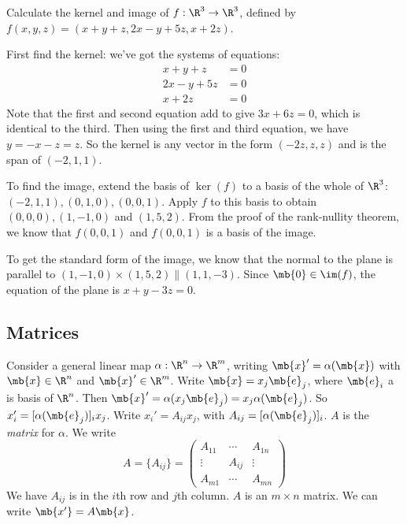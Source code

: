 \documentclass[a4paper]{article}
\begin{document}
\begin{eg}
  Calculate the kernel and image of $f:\R^3\to \R^3$, defined by $f(x, y, z) = (x + y + z, 2x - y+ 5z, x + 2z)$.

  First find the kernel: we've got the systems of equations:
  \begin{align*}
    x + y + z &= 0\\
    2x - y + 5z &= 0\\
    x + 2z  &= 0
  \end{align*}
  Note that the first and second equation add to give $3x + 6z = 0$, which is identical to the third. Then using the first and third equation, we have $y = -x - z = z$. So the kernel is any vector in the form $(-2z, z, z)$ and is the span of $(-2, 1, 1)$.

  To find the image, extend the basis of $\ker(f)$ to a basis of the whole of $\R^3$: $(-2, 1, 1), (0, 1, 0), (0, 0, 1)$. Apply $f$ to this basis to obtain $(0, 0, 0), (1, -1, 0)$ and $(1, 5, 2)$. From the proof of the rank-nullity theorem, we know that $f(0, 0, 1)$ and $f(0, 0, 1)$ is a basis of the image.

  To get the standard form of the image, we know that the normal to the plane is parallel to $(1, -1, 0)\times (1, 5, 2) \parallel (1, 1, -3)$. Since $\mb{0}\in \im (f)$, the equation of the plane is $x + y - 3z = 0$.
\end{eg}

\subsection{Matrices}
\begin{defi}[Matrix]
  Consider a general linear map $\alpha: \R^n\to \R^m$, writing $\mb{x}' = \alpha(\mb{x})$ with $\mb{x}\in \R^n$ and $\mb{x}'\in \R^m$. Write $\mb{x} = x_j\mb{e}_j$, where $\mb{e}_i$ a is basis of $\R^n$. Then $\mb{x}' = \alpha (x_j\mb{e}_j) = x_j\alpha(\mb{e}_j)$. So $x_i' = [\alpha(\mb{e}_j)]_ix_j$. Write $x_i' = A_{ij}x_j$, with $A_{ij} = [\alpha(\mb{e}_j)]_i$. $A$ is the \emph{matrix} for $\alpha$. We write
\[
A = \{A_{ij}\} =
\begin{pmatrix}
  A_{11} & \cdots & A_{1n}\\
  \vdots & A_{ij} & \vdots\\
  A_{m1} & \cdots & A_{mn}
\end{pmatrix}
\]
We have $A_{ij}$ is in the $i$th row and $j$th column. $A$ is an $m\times n$ matrix. We can write $\mb{x'} = A\mb{x}$.
\end{defi}
\end{document}
